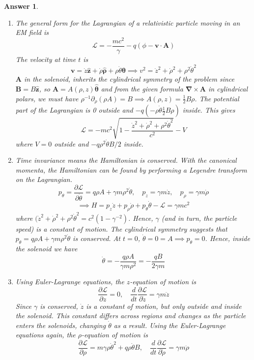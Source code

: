 \documentclass[a4paper]{article}
\newtheorem{ans}{Answer}[section]
\theoremstyle{new}
\begin{document}
\begin{ans}\leavevmode
\begin{enumerate}[label=(\alph*)]
\item The general form for the Lagrangian of a relativistic particle moving in an EM field is
$$\mathcal{L}=-\frac{mc^2}{\gamma}-q(\phi-\mathbf{v}\cdot\mathbf{A})$$
The velocity at time $t$ is
$$\mathbf{v}=\dot{z}\mathbf{\hat{z}}+\dot{\rho}\boldsymbol{\hat{\rho}}+\rho\dot{\theta}\boldsymbol{\hat{\theta}}\implies v^2=\dot{z}^2+\dot{\rho}^2+\rho^2\dot{\theta}^2$$
$\mathbf{A}$ in the solenoid, inherits the cylindrical symmetry of the problem since $\mathbf{B}=B\mathbf{\hat{z}}$, so $\mathbf{A}=A(\rho,z)\boldsymbol{\hat{\theta}}$ and from the given formula $\boldsymbol{\nabla}\times\mathbf{A}$ in cylindrical polars, we must have $\rho^{-1}\partial_\rho(\rho A)=B\implies A(\rho,z)=\frac{1}{2}B\rho$. The potential part of the Lagrangian is 0 outside and $-q(-\rho\dot{\theta}\frac{1}{2}B\rho)$ inside. This gives 
$$\mathcal{L}=-mc^2\sqrt{1-\frac{\dot{z}^2+\dot{\rho}^2+\rho^2\dot{\theta}^2}{c^2}}-V$$
where $V=0$ outside and $-q\rho^2\dot{\theta}B/2$ inside.
\item Time invariance means the Hamiltonian is conserved. With the canonical momenta, the Hamiltonian can be found by performing a Legendre transform on the Lagrangian.
$$p_\theta=\frac{\partial\mathcal{L}}{\partial\dot{\theta}}=q\rho A+\gamma m\rho^2\dot{\theta},\quad p_z=\gamma m\dot{z},\quad p_\rho=\gamma m\dot{\rho}$$
$$\implies H=p_z\dot{z}+p_\rho\dot{\rho}+p_\theta\dot{\theta}-\mathcal{L}=\gamma mc^2$$
where $(\dot{z}^2+\dot{\rho}^2+\rho^2\dot{\theta}^2=c^2(1-\gamma^{-2})$. Hence, $\gamma$ (and in turn, the particle speed) is a constant of motion. The cylindrical symmetry suggests that $p_\theta=q\rho A+\gamma m\rho^2\dot{\theta}$ is conserved. At $t=0$, $\dot{\theta}=0=A\implies p_\theta=0$. Hence, inside the solenoid we have
$$\dot{\theta}=-\frac{q\rho A}{\gamma m\rho^2}=-\frac{qB}{2\gamma m}$$
\item Using Euler-Lagrange equations, the $z$-equation of motion is
$$\frac{\partial\mathcal{L}}{\partial z}=0,\quad \frac{d}{dt}\frac{\partial\mathcal{L}}{\partial\dot{z}}=\gamma m\ddot{z}$$
Since $\gamma$ is conserved, $\dot{z}$ is a constant of motion, but only outside and inside the solenoid. This constant differs across regions and changes as the particle enters the solenoids, changing $\dot{\theta}$ as a result. Using the Euler-Lagrange equations again, the $\rho$-equation of motion is
$$\frac{\partial\mathcal{L}}{\partial\rho}=m\gamma\rho\dot{\theta}^2+q\rho\dot{\theta}B,\quad\frac{d}{dt}\frac{\partial\mathcal{L}}{\partial\dot{\rho}}=\gamma m\ddot{\rho}$$

\end{enumerate}
\end{ans}
\end{document}
